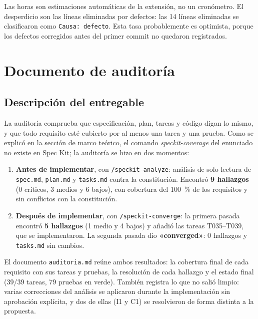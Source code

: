 \documentclass[12pt,a4paper]{article}
\begin{document}
Las horas son estimaciones automáticas de la extensión, no un cronómetro. El desperdicio son las líneas eliminadas por defectos: las 14 líneas eliminadas se clasificaron como \texttt{Causa: defecto}. Esta tasa probablemente es optimista, porque los defectos corregidos antes del primer commit no quedaron registrados.

\newpage
\section{Documento de auditoría}

\subsection{Descripción del entregable}
La auditoría comprueba que especificación, plan, tareas y código digan lo mismo, y que todo requisito esté cubierto por al menos una tarea y una prueba. Como se explicó en la sección de marco teórico, el comando \textit{speckit-coverage} del enunciado no existe en Spec Kit; la auditoría se hizo en dos momentos:

\begin{enumerate}
  \item \textbf{Antes de implementar}, con \texttt{/speckit-analyze}: análisis de solo lectura de \texttt{spec.md}, \texttt{plan.md} y \texttt{tasks.md} contra la constitución. Encontró \textbf{9 hallazgos} (0 críticos, 3 medios y 6 bajos), con cobertura del 100~\% de los requisitos y sin conflictos con la constitución.
  \item \textbf{Después de implementar}, con \texttt{/speckit-converge}: la primera pasada encontró \textbf{5 hallazgos} (1 medio y 4 bajos) y añadió las tareas T035--T039, que se implementaron. La segunda pasada dio \textbf{«converged»}: 0 hallazgos y \texttt{tasks.md} sin cambios.
\end{enumerate}

El documento \texttt{auditoria.md} reúne ambos resultados: la cobertura final de cada requisito con sus tareas y pruebas, la resolución de cada hallazgo y el estado final (39/39 tareas, 79 pruebas en verde). También registra lo que no salió limpio: varias correcciones del análisis se aplicaron durante la implementación sin aprobación explícita, y dos de ellas (I1 y C1) se resolvieron de forma distinta a la propuesta.
\end{document}
